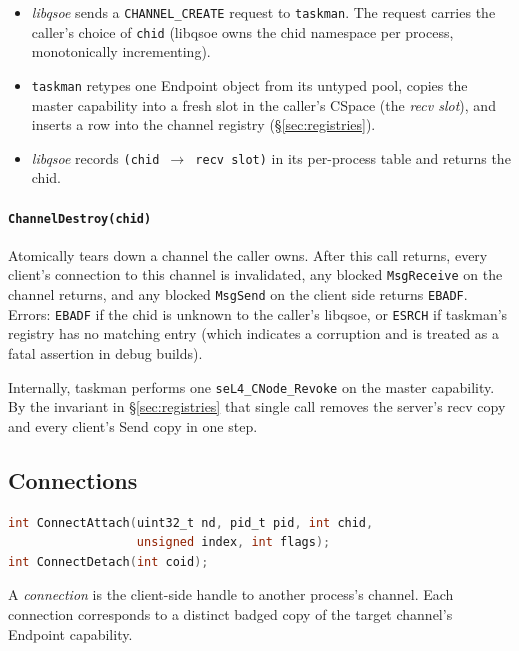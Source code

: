 \begin{itemize}
    \item \emph{libqsoe} sends a \texttt{CHANNEL\_CREATE} request to
          \texttt{taskman}.  The request carries the caller's choice of
          \texttt{chid} (libqsoe owns the chid namespace per process,
          monotonically incrementing).
    \item \texttt{taskman} retypes one Endpoint object from its untyped
          pool, copies the master capability into a fresh slot in the
          caller's CSpace (the \emph{recv slot}), and inserts a row
          into the channel registry (\S\ref{sec:registries}).
    \item \emph{libqsoe} records \texttt{(chid $\to$ recv slot)} in its
          per-process table and returns the chid.
\end{itemize}

\paragraph{\texttt{ChannelDestroy(chid)}}
Atomically tears down a channel the caller owns.  After this call
returns, every client's connection to this channel is invalidated, any
blocked \texttt{MsgReceive} on the channel returns, and any blocked
\texttt{MsgSend} on the client side returns \texttt{EBADF}.  Errors:
\texttt{EBADF} if the chid is unknown to the caller's libqsoe, or
\texttt{ESRCH} if taskman's registry has no matching entry (which
indicates a corruption and is treated as a fatal assertion in debug
builds).

Internally, taskman performs one \texttt{seL4\_CNode\_Revoke} on the
master capability.  By the invariant in \S\ref{sec:registries} that
single call removes the server's recv copy and every client's Send
copy in one step.

\subsection{Connections}
\label{sec:connections}

\begin{lstlisting}[language=C]
int ConnectAttach(uint32_t nd, pid_t pid, int chid,
                  unsigned index, int flags);
int ConnectDetach(int coid);
\end{lstlisting}

A \emph{connection} is the client-side handle to another process's
channel.  Each connection corresponds to a distinct badged copy of the
target channel's Endpoint capability.

